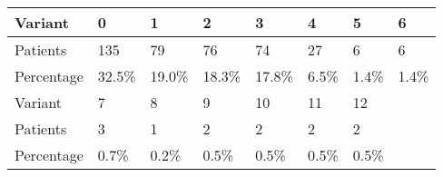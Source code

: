 \begin{tabular}{llllllll}
  \hline
  \hline
Variant &     0  &     1  &     2  &     3  &    4  &    5  &    6  \\
\hline
Patients   &    135 &     79 &     76 &     74 &    27 &     6 &     6 \\
  Percentage &  32.5\% &  19.0\% &  18.3\% &  17.8\% &  6.5\% &  1.4\% &  1.4\%\\
  \hline
  \hline
Variant &     7  &    8  &    9  &    10 &    11 &    12 \\
\hline
Patients   &   3 &     1 &     2 &     2 &     2 &     2 \\
Percentage &  0.7\% &  0.2\% &  0.5\% &  0.5\% &  0.5\% &  0.5\% \\
  \hline
  \hline
  
\end{tabular}
